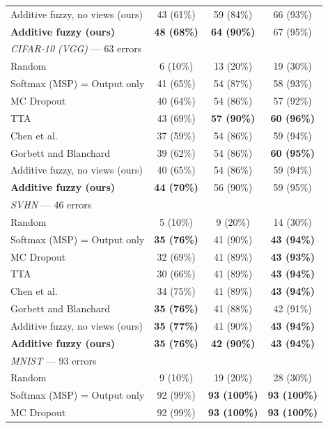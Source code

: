 \begin{table}[t]
{\begin{tabular}{lccc}
Additive fuzzy, no views (ours) & 43 (61\%) & 59 (84\%) & 66 (93\%) \\
\textbf{Additive fuzzy (ours)} & \textbf{48 (68\%)} & \textbf{64 (90\%)} & 67 (95\%) \\
\midrule
\multicolumn{4}{l}{\textit{CIFAR-10 (VGG)} --- 63 errors} \\
Random & 6 (10\%) & 13 (20\%) & 19 (30\%) \\
Softmax (MSP) = Output only & 41 (65\%) & 54 (87\%) & 58 (93\%) \\
MC Dropout & 40 (64\%) & 54 (86\%) & 57 (92\%) \\
TTA & 43 (69\%) & \textbf{57 (90\%)} & \textbf{60 (96\%)} \\
Chen et al.~\cite{chen2019} & 37 (59\%) & 54 (86\%) & 59 (94\%) \\
Gorbett and Blanchard~\cite{gorbett2022} & 39 (62\%) & 54 (86\%) & \textbf{60 (95\%)} \\
Additive fuzzy, no views (ours) & 40 (65\%) & 54 (86\%) & 59 (94\%) \\
\textbf{Additive fuzzy (ours)} & \textbf{44 (70\%)} & 56 (90\%) & 59 (95\%) \\
\midrule
\multicolumn{4}{l}{\textit{SVHN} --- 46 errors} \\
Random & 5 (10\%) & 9 (20\%) & 14 (30\%) \\
Softmax (MSP) = Output only & \textbf{35 (76\%)} & 41 (90\%) & \textbf{43 (94\%)} \\
MC Dropout & 32 (69\%) & 41 (89\%) & \textbf{43 (93\%)} \\
TTA & 30 (66\%) & 41 (89\%) & \textbf{43 (94\%)} \\
Chen et al.~\cite{chen2019} & 34 (75\%) & 41 (89\%) & \textbf{43 (94\%)} \\
Gorbett and Blanchard~\cite{gorbett2022} & \textbf{35 (76\%)} & 41 (88\%) & 42 (91\%) \\
Additive fuzzy, no views (ours) & \textbf{35 (77\%)} & 41 (90\%) & \textbf{43 (94\%)} \\
\textbf{Additive fuzzy (ours)} & \textbf{35 (76\%)} & \textbf{42 (90\%)} & \textbf{43 (94\%)} \\
\midrule
\multicolumn{4}{l}{\textit{MNIST} --- 93 errors} \\
Random & 9 (10\%) & 19 (20\%) & 28 (30\%) \\
Softmax (MSP) = Output only & 92 (99\%) & \textbf{93 (100\%)} & \textbf{93 (100\%)} \\
MC Dropout & 92 (99\%) & \textbf{93 (100\%)} & \textbf{93 (100\%)} \\

\end{tabular}}
\end{table}
